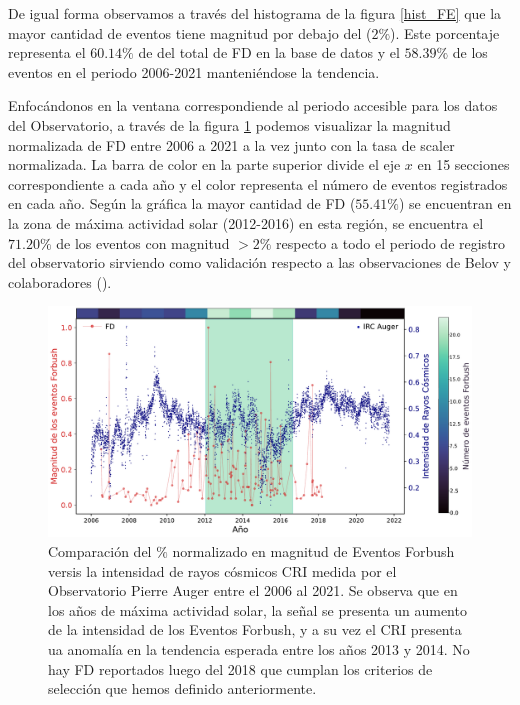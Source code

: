 De igual forma observamos a través del histograma de la figura \ref{hist_FE} que la mayor cantidad de eventos tiene magnitud por debajo del ($2\%$). Este porcentaje representa el $60.14\%$ de del total de FD en la base de datos y el $58.39\%$ de los eventos en el periodo 2006-2021 manteniéndose la tendencia.

Enfocándonos en la ventana correspondiende al periodo accesible para los datos del Observatorio, a través de la figura \ref{fig:FD_scaler} podemos visualizar la magnitud normalizada de FD entre 2006 a 2021 a la vez junto con la tasa de scaler normalizada. La barra de color en la parte superior divide el eje $x$ en 15 secciones correspondiente a cada año  y el color representa el número de eventos registrados en cada año.
Según la gráfica la mayor cantidad de FD ($55.41\%$) se encuentran en la zona de máxima actividad solar (2012-2016) en esta región,  se encuentra el $71.20\%$ de los eventos con magnitud $>2\%$ respecto a todo el periodo de registro del observatorio sirviendo como validación respecto a las observaciones de Belov y colaboradores (\cite{belov_2009}).
\begin{figure}
    \includegraphics[width=1\linewidth]{Figs/Figr/FD_scaler_AUGER.pdf}
    \caption{Comparación del $\%$ normalizado en magnitud de Eventos Forbush versis la intensidad de rayos cósmicos CRI medida por el Observatorio Pierre Auger entre el 2006 al 2021. Se observa que en los años de máxima actividad solar, la señal se presenta un aumento de la intensidad de los Eventos Forbush, y a su vez el CRI presenta ua anomalía en la tendencia esperada entre los años 2013 y 2014. No hay FD reportados luego del 2018 que cumplan los criterios de selección que hemos definido anteriormente.}
    \label{fig:FD_scaler}
\end{figure}
